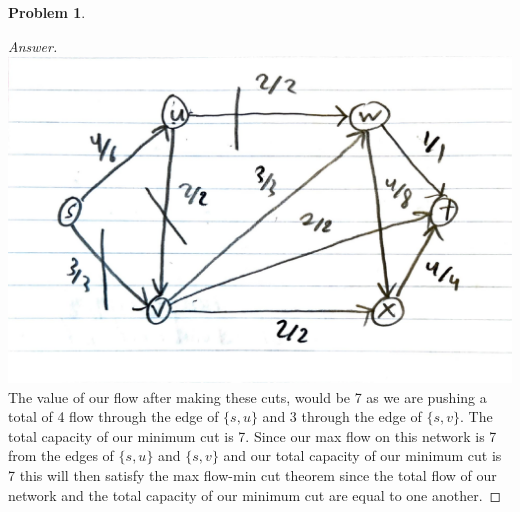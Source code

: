 \documentclass[11pt]{article}
\theoremstyle{definition}
\theoremstyle{definition}
\newtheorem{required}{Problem}
\theoremstyle{definition}
\begin{document}
\begin{required}
\begin{enumerate}[label=(\alph*)]
\begin{proof}[Answer]
\includegraphics[scale=0.5]{Huynh_CSCI3104_HW4Pic.pdf} \\
The value of our flow after making these cuts, would be 7 as we are pushing a total of 4 flow through the edge of $\{s, u\}$ and 3 through the edge of $\{s, v\}$. The total capacity of our minimum cut is 7. Since our max flow on this network is 7 from the edges of $\{s, u\}$ and $\{s, v\}$ and our total capacity of our minimum cut is 7 this will then satisfy the max flow-min cut theorem since the total flow of our network and the total capacity of our minimum cut are equal to one another.
\end{proof}
    
\end{enumerate}

\end{required}



\end{document}
